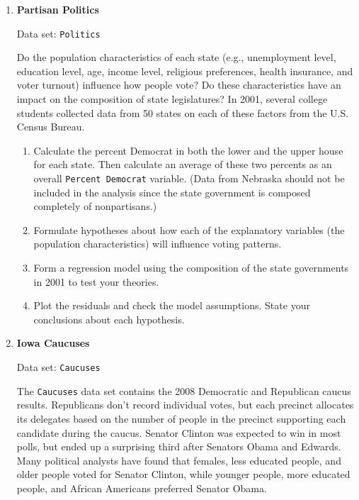 \documentclass[
]{report}
\begin{document}
\begin{enumerate}
The \texttt{AIDS} data set shows the prevalence of HIV/AIDS in adults aged 15 to 49 in least developed countries along with country-level data on several socioeconomic factors. Use this data set to create a multivariate regression model to predict the prevalence of HIV/AIDS from socioeconomic factors.

  \item \textbf{Partisan Politics}

Data set: \texttt{Politics}

Do the population characteristics of each state (e.g., unemployment level, education level, age, income level, religious preferences, health insurance, and voter turnout) influence how people vote? Do these characteristics have an impact on the composition of state legislatures? In 2001, several college students collected data from 50 states on each of these factors from the U.S. Census Bureau.

  \begin{enumerate}
      \item Calculate the percent Democrat in both the lower and the upper house for each state. Then calculate an average of these two percents as an overall \texttt{Percent Democrat} variable. (Data from Nebraska should not be included in the analysis since the state government is composed completely of nonpartisans.)
      \item Formulate hypotheses about how each of the explanatory variables (the population characteristics) will influence voting patterns.
      \item Form a regression model using the composition of the state governments in 2001 to test your theories.
      \item Plot the residuals and check the model assumptions. State your conclusions about each hypothesis.
    \end{enumerate}

  \item \textbf{Iowa Caucuses}

Data set: \texttt{Caucuses}

The \texttt{Caucuses} data set contains the 2008 Democratic and Republican caucus results. Republicans don’t record individual votes, but each precinct allocates its delegates based on the number of people in the precinct supporting each candidate during the caucus. Senator Clinton was expected to win in most polls, but ended up a surprising third after Senators Obama and Edwards. Many political analysts have found that females, less educated people, and older people voted for Senator Clinton, while younger people, more educated people, and African Americans preferred Senator Obama.


\end{enumerate}
\end{document}
